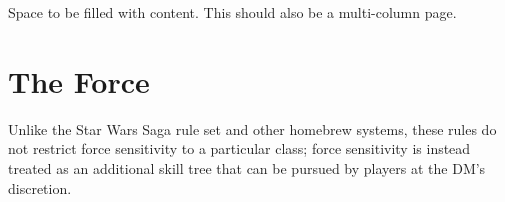 \documentclass[a4paper,10pt,final,twocolumn,oneside]{book}
\begin{document}
Space to be filled with content. This should also be a multi-column page.


\section{The Force} %
\label{sec:the_force}

Unlike the Star Wars Saga rule set and other homebrew systems, these rules do not restrict force sensitivity to a particular class; force sensitivity is instead treated as an additional skill tree that can be pursued by players at the DM's discretion.


\end{document}

